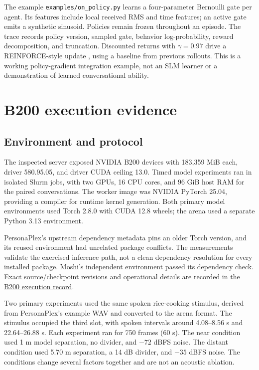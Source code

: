 \documentclass{article}
\newcommand{\code}[1]{\texttt{#1}}
\begin{document}
The example \code{examples/on\_policy.py} learns a four-parameter Bernoulli gate per agent. Its features include local received RMS and time features; an active gate emits a synthetic sinusoid. Policies remain frozen throughout an episode. The trace records policy version, sampled gate, behavior log-probability, reward decomposition, and truncation. Discounted returns with $\gamma=0.97$ drive a REINFORCE-style update \citep{williams1992simple}, using a baseline from previous rollouts. This is a working policy-gradient integration example, not an SLM learner or a demonstration of learned conversational ability.

\section{B200 execution evidence}
\subsection{Environment and protocol}
The inspected server exposed NVIDIA B200 devices with 183,359 MiB each, driver 580.95.05, and driver CUDA ceiling 13.0. Timed model experiments ran in isolated Slurm jobs, with two GPUs, 16 CPU cores, and 96 GiB host RAM for the paired conversations. The worker image was NVIDIA PyTorch 25.04, providing a compiler for runtime kernel generation. Both primary model environments used Torch 2.8.0 with CUDA 12.8 wheels; the arena used a separate Python 3.13 environment.

PersonaPlex's upstream dependency metadata pins an older Torch version, and its reused environment had unrelated package conflicts. The measurements validate the exercised inference path, not a clean dependency resolution for every installed package. Moshi's independent environment passed its dependency check. Exact source/checkpoint revisions and operational details are recorded in \href{https://github.com/KyuDan1/duplex-arena/blob/main/docs/B200_VERIFICATION.md}{the B200 execution record}.

Two primary experiments used the same spoken rice-cooking stimulus, derived from PersonaPlex's example WAV and converted to the arena format. The stimulus occupied the third slot, with spoken intervals around 4.08--8.56 s and 22.64--26.88 s. Each experiment ran for 750 frames (60 s). The near condition used 1 m model separation, no divider, and $-72$ dBFS noise. The distant condition used 5.70 m separation, a 14 dB divider, and $-35$ dBFS noise. The conditions change several factors together and are not an acoustic ablation.
\end{document}
